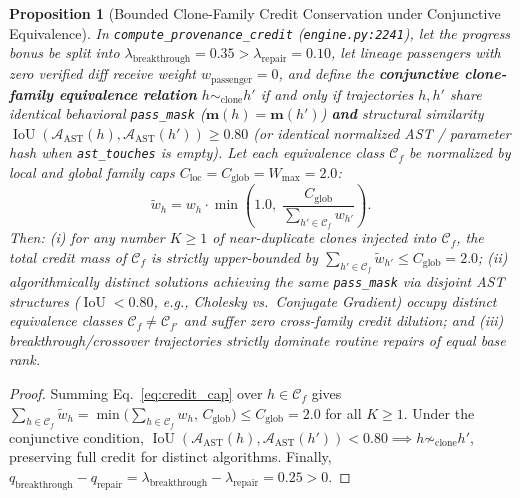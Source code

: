 \documentclass[11pt,a4paper]{article}
\newtheorem{proposition}{Proposition}
\begin{document}
\begin{proposition}[Bounded Clone-Family Credit Conservation under Conjunctive Equivalence]
\label{prop:credit_cap}
In \texttt{compute\_provenance\_credit} (\texttt{engine.py:2241}), let the progress bonus be split into $\lambda_{\text{breakthrough}} = 0.35 > \lambda_{\text{repair}} = 0.10$, let lineage passengers with zero verified diff receive weight $w_{\text{passenger}} = 0$, and define the \textbf{conjunctive clone-family equivalence relation} $h \sim_{\text{clone}} h'$ if and only if trajectories $h, h'$ share identical behavioral \texttt{pass\_mask} ($\mathbf{m}(h) = \mathbf{m}(h')$) \textbf{and} structural similarity $\operatorname{IoU}(\mathcal{A}_{\text{AST}}(h), \mathcal{A}_{\text{AST}}(h')) \ge 0.80$ (or identical normalized AST / parameter hash when \texttt{ast\_touches} is empty). Let each equivalence class $\mathcal{C}_f$ be normalized by local and global family caps $C_{\text{loc}} = C_{\text{glob}} = W_{\max} = 2.0$:
\begin{equation}
\tilde{w}_h = w_h \cdot \min\!\left(1.0,\; \frac{C_{\text{glob}}}{\sum_{h' \in \mathcal{C}_f} w_{h'}}\right).
\tag{8}\label{eq:credit_cap}
\end{equation}
Then: (i) for any number $K \ge 1$ of near-duplicate clones injected into $\mathcal{C}_f$, the total credit mass of $\mathcal{C}_f$ is strictly upper-bounded by $\sum_{h' \in \mathcal{C}_f} \tilde{w}_{h'} \le C_{\text{glob}} = 2.0$; (ii) algorithmically distinct solutions achieving the same \texttt{pass\_mask} via disjoint AST structures ($\operatorname{IoU} < 0.80$, e.g., Cholesky vs.\ Conjugate Gradient) occupy distinct equivalence classes $\mathcal{C}_f \ne \mathcal{C}_{f'}$ and suffer zero cross-family credit dilution; and (iii) breakthrough/crossover trajectories strictly dominate routine repairs of equal base rank.
\end{proposition}
\begin{proof}
Summing Eq.~\eqref{eq:credit_cap} over $h \in \mathcal{C}_f$ gives $\sum_{h \in \mathcal{C}_f} \tilde{w}_h = \min\bigl(\sum_{h \in \mathcal{C}_f} w_h,\, C_{\text{glob}}\bigr) \le C_{\text{glob}} = 2.0$ for all $K \ge 1$. Under the conjunctive condition, $\operatorname{IoU}(\mathcal{A}_{\text{AST}}(h), \mathcal{A}_{\text{AST}}(h')) < 0.80 \implies h \not\sim_{\text{clone}} h'$, preserving full credit for distinct algorithms. Finally, $q_{\text{breakthrough}} - q_{\text{repair}} = \lambda_{\text{breakthrough}} - \lambda_{\text{repair}} = 0.25 > 0$.
\end{proof}
\end{document}
